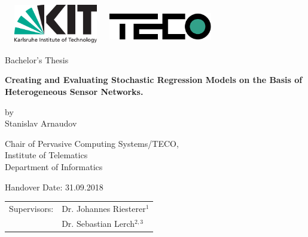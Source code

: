 \documentclass[12pt,a4paper,twoside]{scrartcl}
\numberwithin{equation}{section}
\begin{document}
\boldmath
\nonfrenchspacing

\pagestyle{empty}


\setlength{\parindent}{4em}
\setlength{\parskip}{1em}

\begin{titlepage}

  \begin{center}\large

    {\flushleft\includegraphics[height=17mm, width=45mm]{kit_logo_en.pdf} \hfill}
    \includegraphics[height=15mm, width=45mm]{group_logo.pdf}\quad\null

    \vspace*{1cm}

    Bachelor's Thesis
    \vspace*{1cm}

    {\bf\huge Creating and Evaluating  Stochastic Regression Models on the Basis of Heterogeneous Sensor Networks. \par} %

    \vfill

    by\\
    \vspace*{3mm}
    {\huge{Stanislav Arnaudov}}
    

    \vspace*{10mm}
    Chair of Pervasive Computing Systems/TECO,\\
    Institute of Telematics\\
    Department of Informatics\\
    \vspace*{20mm}

    Handover Date: 31.09.2018

    \vspace*{20mm}

    
    
    \begin{tabular}{rl}
      Supervisors: &Dr. Johannes Riesterer\(^1\) \\
                   &Dr. Sebastian Lerch\(^{2,3}\)     \\
    \end{tabular}
    

\end{center}
\end{titlepage}
\end{document}
